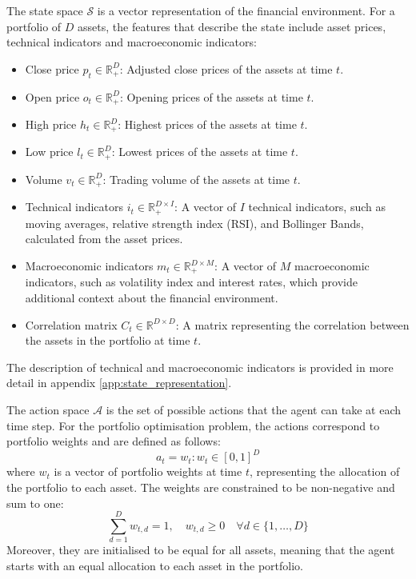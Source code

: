 The state space $\mathcal{S}$ is a vector representation of the financial environment. For a portfolio of $D$ assets, the features that describe the state include asset prices, technical indicators and macroeconomic indicators: 
\begin{itemize}
    \item Close price $p_t \in \mathbb{R}_+^D$: Adjusted close prices of the assets at time $t$.
    \item Open price $o_t \in \mathbb{R}_+^D$: Opening prices of the assets at time $t$.
    \item High price $h_t \in \mathbb{R}_+^D$: Highest prices of the assets at time $t$.
    \item Low price $l_t \in \mathbb{R}_+^D$: Lowest prices of the assets at time $t$.
    \item Volume $v_t \in \mathbb{R}_+^D$: Trading volume of the assets at time $t$.
    \item Technical indicators $i_t \in \mathbb{R}_+^{D \times I}$: A vector of $I$ technical indicators, such as moving averages, relative strength index (RSI), and Bollinger Bands, calculated from the asset prices.
    \item Macroeconomic indicators $m_t \in \mathbb{R}_+^{D \times M}$: A vector of $M$ macroeconomic indicators, such as volatility index and interest rates, which provide additional context about the financial environment.
    \item Correlation matrix $C_t \in \mathbb{R}^{D \times D}$: A matrix representing the correlation between the assets in the portfolio at time $t$.
\end{itemize}

The description of technical and macroeconomic indicators is provided in more detail in appendix \ref{app:state_representation}.

The action space $\mathcal{A}$ is the set of possible actions that the agent can take at each time step. For the portfolio optimisation problem, the actions correspond to portfolio weights and are defined as follows:
\begin{equation}
    a_t = w_t : w_t \in [0, 1]^D
\end{equation}
where $w_t$ is a vector of portfolio weights at time $t$, representing the allocation of the portfolio to each asset. The weights are constrained to be non-negative and sum to one:
\begin{equation}
    \sum_{d=1}^D w_{t,d} = 1, \quad w_{t,d} \geq 0 \quad \forall d \in \{1, \ldots, D\}
\end{equation}
Moreover, they are initialised to be equal for all assets, meaning that the agent starts with an equal allocation to each asset in the portfolio.

